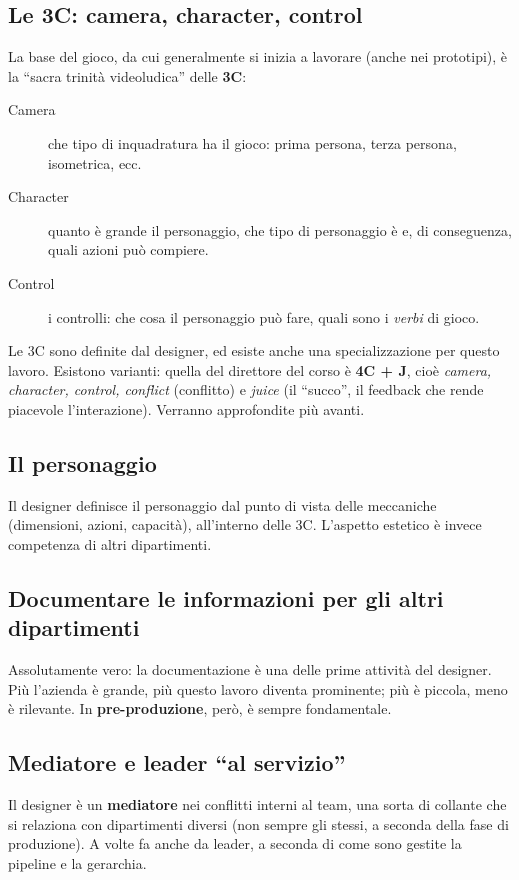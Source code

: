 \subsection{Le 3C: camera, character, control}

La base del gioco, da cui generalmente si inizia a lavorare (anche nei
prototipi), è la ``sacra trinità videoludica'' delle \textbf{3C}:
\begin{description}
  \item[Camera] che tipo di inquadratura ha il gioco: prima persona, terza
        persona, isometrica, ecc.
  \item[Character] quanto è grande il personaggio, che tipo di personaggio è
        e, di conseguenza, quali azioni può compiere.
  \item[Control] i controlli: che cosa il personaggio può fare, quali sono i
        \emph{verbi} di gioco.
\end{description}
Le 3C sono definite dal designer, ed esiste anche una specializzazione per
questo lavoro. Esistono varianti: quella del direttore del corso è
\textbf{4C + J}, cioè \emph{camera, character, control, conflict} (conflitto)
e \emph{juice} (il ``succo'', il feedback che rende piacevole l'interazione).
Verranno approfondite più avanti.

\subsection{Il personaggio}

Il designer definisce il personaggio dal punto di vista delle meccaniche
(dimensioni, azioni, capacità), all'interno delle 3C. L'aspetto estetico è
invece competenza di altri dipartimenti.

\subsection{Documentare le informazioni per gli altri dipartimenti}

Assolutamente vero: la documentazione è una delle prime attività del
designer. Più l'azienda è grande, più questo lavoro diventa prominente; più è
piccola, meno è rilevante. In \textbf{pre-produzione}, però, è sempre
fondamentale.

\subsection{Mediatore e leader ``al servizio''}

Il designer è un \textbf{mediatore} nei conflitti interni al team, una sorta
di collante che si relaziona con dipartimenti diversi (non sempre gli stessi,
a seconda della fase di produzione). A volte fa anche da leader, a seconda di
come sono gestite la pipeline e la gerarchia.

